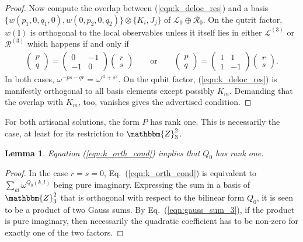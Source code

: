 \documentclass[aps,nofootinbib,floatfix,a4paper]{revtex4}
\newtheorem{lemma}[theorem]{Lemma}
\newcommand{\1}{\mbox{$\mathbf{1}$}}
\def\ZZ{\mathbbm{Z}}
\def\R{\mathcal{R}}
\renewcommand{\vec}{\mathbf}
\begin{document}
\begin{proof}
	Now compute the overlap between (\ref{eqn:k_deloc_res}) 
	and a basis $\{w(p_1,0,q_1,0), w(0,p_2,0,q_2)\} \otimes \{ K_i, J_j\}$ of 
	$\mathcal{L}_0 \oplus \mathcal{R}_0$.
	On the qutrit factor, $w(\vec l)$ is orthogonal to the local observables unless it itself lies in either $\mathcal{L}^{(3)}$ or $\R^{(3)}$ which happens if and only if
	\begin{align*}
		\begin{pmatrix}
			p\\
			q
		\end{pmatrix}
		=
		\begin{pmatrix}
			0&-1\\
			-1&0
		\end{pmatrix}
		\begin{pmatrix}
			r\\
			s
		\end{pmatrix}
		\qquad
		\text{or}
		\qquad
		\begin{pmatrix}
			p\\
			q
		\end{pmatrix}
		=
		\begin{pmatrix}
			1&1\\
			1&-1
		\end{pmatrix}
		\begin{pmatrix}
			r\\
			s
		\end{pmatrix}.
	\end{align*}
	In both cases, $\omega^{-ps-qr}=\omega^{r^2+s^2}$.
	On the qubit factor, (\ref{eqn:k_deloc_res}) is manifestly orthogonal to all basis elements except possibly $K_m$.
	Demanding that the overlap with $K_m$, too, vanishes gives the advertised condition.
\end{proof}

For both artisanal solutions, the form $P$ has rank one.
This is necessarily the case, at least for its restriction to $\ZZ_3^2$.

\begin{lemma}\label{eqn:rank_lemma}
	Equation (\ref{eqn:k_orth_cond}) implies that $Q_0$ has rank one.
\end{lemma}

\begin{proof}
	In the case $r=s=0$, Eq.~(\ref{eqn:k_orth_cond}) is equivalent to $\sum_{kl} \omega^{Q_0(k,l)}$ being pure imaginary.
	Expressing the sum in a basis of $\ZZ_3^2$ that is orthogonal with respect to the bilinear form $Q_0$, it is seen to be a product of two Gauss sums.
	By Eq.~(\ref{eqn:gauss_sum_3}), if the product is pure imaginary, then necessarily the quadratic coefficient has to be non-zero for exactly one of the two factors.
\end{proof}
\end{document}
